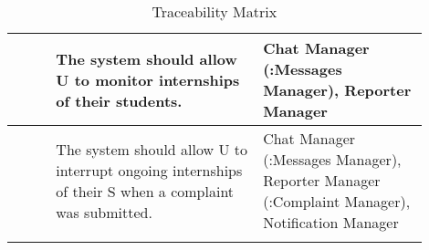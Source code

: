 \begin{center}
\begin{longtable}{|l|p{0.5\linewidth}|p{0.4\linewidth}|}
        \hline
        [R\creq] & The system should allow U to monitor internships of their students. & Chat Manager \newline (:Messages Manager), \newline Reporter Manager\\
        \hline
        [R\creq] & The system should allow U to interrupt ongoing internships of their S when a complaint was submitted. & Chat Manager \newline (:Messages Manager), \newline Reporter Manager \newline(:Complaint Manager), \newline Notification Manager\\
        \hline
        \caption{Traceability Matrix}
        \label{tab:tracebility_matrix}%
    \end{longtable}
\end{center}